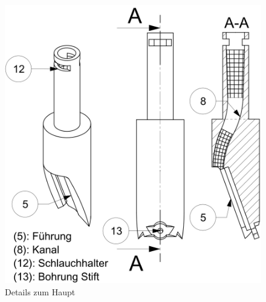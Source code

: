 	\begin{figure}[H]
	\includegraphics[scale=1.0]{Illustrationen/6-Umsetzung/details_haupt.jpg}
	\caption{Details zum Haupt}
	\label{fig:details_haupt}
	\end{figure}

